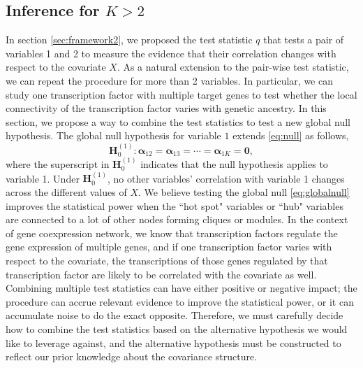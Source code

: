 \documentclass[aoas,preprint]{imsart}
\numberwithin{equation}{section}
\theoremstyle{plain}
\begin{document}
\subsection{Inference for $K > 2$\label{sec:frameworkK}} 
In section \ref{sec:framework2}, we proposed the test statistic $q$ that tests a pair of variables 1 and 2 to measure the evidence that their correlation changes with respect to the covariate $X$. %
As a natural extension to the pair-wise test statistic, we can repeat the procedure for more than 2 variables. In particular, we can study one transcription factor with  multiple target genes to test whether the local connectivity of the transcription factor varies with genetic ancestry. In this section, we propose a way to combine the test statistics to test a new global null hypothesis. The global null hypothesis for variable $1$ extends \ref{eq:null} as follows,
\begin{equation}
    \bm{H}_0^{(1)}: \bm{\alpha}_{12} = \bm{\alpha}_{13} = \cdots = \bm{\alpha}_{1K} = \bm{0},
\label{eq:globalnull}
\end{equation}
where the superscript in $\bm{H}_0^{(1)}$ indicates that the null hypothesis applies to variable 1. Under $\bm{H}_0^{(1)}$, no other variables' correlation with variable 1 changes across the different values of  $X$. We believe testing the global null \ref{eq:globalnull} improves the statistical power when the ``hot spot" variables or ``hub" variables are connected to a lot of other nodes forming cliques or modules. In the context of gene coexpression network, we know that transcription factors regulate the gene expression of multiple genes, and if one transcription factor varies with respect to the covariate, the transcriptions of those genes regulated by that transcription factor are likely to be correlated with the covariate as well. \\

Combining multiple test statistics can have either positive or negative impact; the procedure can accrue relevant evidence to improve the statistical power, or it can accumulate noise to do the exact opposite. Therefore, we must carefully decide how to combine the test statistics based on the alternative hypothesis we would like to leverage against, and the alternative hypothesis must be constructed to reflect our prior knowledge about the covariance structure. \\
\end{document}
